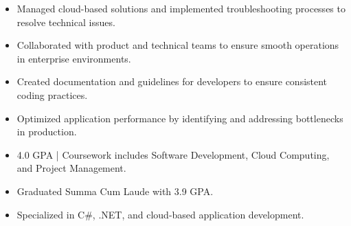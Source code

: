 \par\smallskip
\noindent
\begin{minipage}{20cm}
  \begin{minipage}{9.75cm}
    \begin{itemize}
      \item Managed cloud-based solutions and implemented troubleshooting processes to resolve technical issues.
      \item Collaborated with product and technical teams to ensure smooth operations in enterprise environments.
    \end{itemize}
  \end{minipage}
  \hfill
  \begin{minipage}{9.75cm}
    \begin{itemize}
      \item Created documentation and guidelines for developers to ensure consistent coding practices.
      \item Optimized application performance by identifying and addressing bottlenecks in production.
    \end{itemize}
  \end{minipage}
\end{minipage}
\par\smallskip
\divider

\begin{itemize}
  \item 4.0 GPA | Coursework includes Software Development, Cloud Computing, and Project Management.
\end{itemize}
\divider

\begin{itemize}
  \item Graduated Summa Cum Laude with 3.9 GPA.
  \item Specialized in C#, .NET, and cloud-based application development.
\end{itemize}

\noindent
\begin{minipage}{20cm}
\end{minipage}


